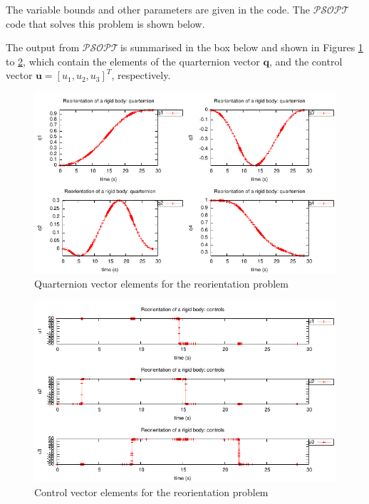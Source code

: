\documentclass[a4paper,11pt]{report}    %
\newcommand{\psopt}{$\mathcal{PSOPT}$\,}  %
\newenvironment{shadedframe}{%
  \def\FrameCommand{\fcolorbox{black}{shadecolor}}%
  \MakeFramed {\FrameRestore}}
{\endMakeFramed}
\begin{document}
The variable bounds and other parameters are given in the code. The \psopt code that solves this problem is shown below.  

\tiny
\begin{shadedframe}

\end{shadedframe}
\normalsize

The output from \psopt is summarised in the box below and  shown in Figures \ref{fig:reorientation_q} to \ref{fig:reorientation_u}, which contain the elements
of the quarternion vector $\mathbf{q}$, and the control vector $\mathbf{u} = [u_1, u_2, u_3]^T$, respectively.

\begin{shadedframe}

\end{shadedframe}


\begin{figure}
  \centering 
  \includegraphics{../examples/reorientation/reorientation_q}
  \caption{Quarternion vector elements for the reorientation problem}
 \label{fig:reorientation_q}
\end{figure}

\begin{figure}
  \centering 
  \includegraphics{../examples/reorientation/reorientation_u}
  \caption{Control vector elements for the reorientation problem}
 \label{fig:reorientation_u}
\end{figure}
\end{document}
